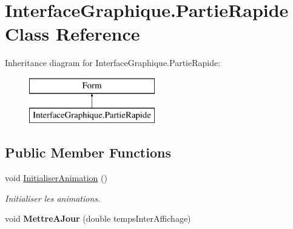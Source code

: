 \hypertarget{class_interface_graphique_1_1_partie_rapide}{}\section{Interface\+Graphique.\+Partie\+Rapide Class Reference}
\label{class_interface_graphique_1_1_partie_rapide}
Inheritance diagram for Interface\+Graphique.\+Partie\+Rapide\+:\begin{figure}[H]
\begin{center}
\leavevmode
\includegraphics[height=2.000000cm]{class_interface_graphique_1_1_partie_rapide}
\end{center}
\end{figure}
\subsection*{Public Member Functions}
\begin{DoxyCompactItemize}
\item 
\hypertarget{class_interface_graphique_1_1_partie_rapide_af5ff96f0fca70376fe5e1a69565eb592}{}\label{class_interface_graphique_1_1_partie_rapide_af5ff96f0fca70376fe5e1a69565eb592} 
void \hyperlink{class_interface_graphique_1_1_partie_rapide_af5ff96f0fca70376fe5e1a69565eb592}{Initialiser\+Animation} ()
\begin{DoxyCompactList}\small\item\em Initialiser les animations. \end{DoxyCompactList}\item 
\hypertarget{class_interface_graphique_1_1_partie_rapide_a91f0bc169fe8a836dd75d2447b4db424}{}\label{class_interface_graphique_1_1_partie_rapide_a91f0bc169fe8a836dd75d2447b4db424} 
void {\bfseries Mettre\+A\+Jour} (double temps\+Inter\+Affichage)
\end{DoxyCompactItemize}
